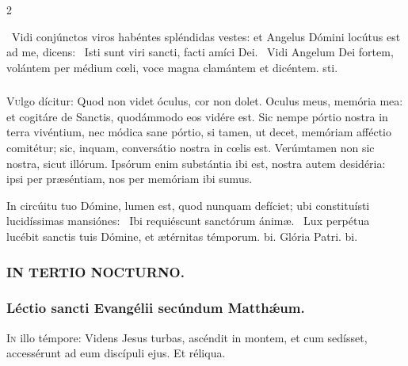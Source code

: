 \documentclass[9pt,twoside]{extarticle}
\begin{document}
\begin{multicols}{2}
\begin{tightlist}{}
\item {}~Vidi conjúnctos viros habéntes spléndidas vestes: et Angelus Dómini locútus est ad me, dicens: \textred{*}~Isti sunt viri sancti, facti amíci Dei.
~Vidi Angelum Dei fortem, volántem per médium cœli, voce magna clamántem et dicéntem. sti.
\end{tightlist}

\subsubsection*{\center {}}
\lettrine{V}ulgo dícitur: Quod non videt óculus, cor non dolet. Oculus meus, memória mea: et cogitáre de Sanctis, quodámmodo eos vidére est. Sic nempe pórtio nostra in terra vivéntium, nec módica sane pórtio, si tamen, ut decet, memóriam afféctio comitétur; sic, inquam, conversátio nostra in cœlis est. Verúmtamen non sic nostra, sicut illórum. Ipsórum enim substántia ibi est, nostra autem desidéria: ipsi per præséntiam, nos per memóriam ibi sumus.

\begin{tightlist}{}
\item {} In circúitu tuo Dómine, lumen est, quod nunquam defíciet; ubi constituísti lucidíssimas mansiónes: \textred{*}~Ibi requiéscunt sanctórum ánimæ.
~Lux perpétua lucébit sanctis tuis Dómine, et ætérnitas témporum. bi. Glória Patri. bi.
\end{tightlist}

\subsubsection*{\center \textsc{IN TERTIO NOCTURNO.}}
\subsubsection*{\center Léctio sancti Evangélii secúndum Matthǽum.}
\lettrine{I}n illo témpore: Videns Jesus turbas, ascéndit in montem, et cum sedísset, accessérunt ad eum discípuli ejus. Et réliqua.


\end{multicols}
\end{document}
